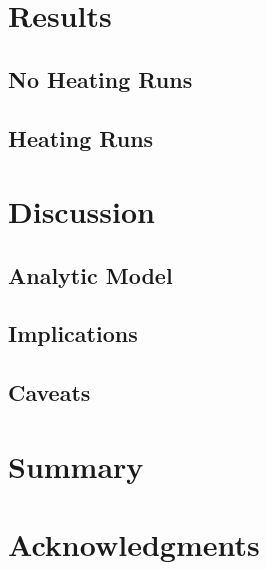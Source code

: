 \documentclass[useAMS,usenatbib]{mn2e}
\begin{document}
% 
\section{Results}
\label{sec:results}
\subsection{No Heating Runs}
\subsection{Heating Runs}

% 
\section{Discussion}
\label{sec:discussion}
\subsection{Analytic Model}
\subsection{Implications}
\subsection{Caveats}

% 
\section{Summary}

% 
\section*{Acknowledgments}

%
\end{document}
